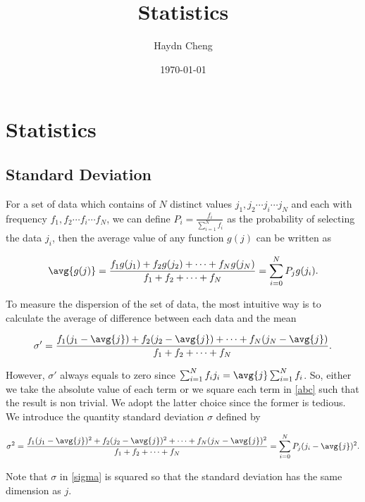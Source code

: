 \documentclass[english,a4paper,12pt]{report}
\title{Statistics}
\author{Haydn Cheng}
\date{\today}
\begin{document}
\maketitle
\tableofcontents
    
\chapter{Statistics}
		
\section{Standard Deviation}

For a set of data which contains of \(N\) distinct values \(j_1, j_2 \cdots j_i \cdots j_N\) and each with frequency \(f_1, f_2 \cdots f_i \cdots f_N\), we can define \(P_i = \frac{f_i}{\sum_{i=1}^{N} f_i}\) as the probability of selecting the data \(j_i\), then the average value of any function \(g(j)\) can be written as 
	
\begin{equation}
	 \avg{g(j)}  = \frac{f_1 g(j_1) + f_2 g(j_2) + \cdots + f_N g(j_N)}{f_1 + f_2 + \cdots + f_N} = \sum_{i=0}^{N} P_j g(j_i). \label{prob} 
\end{equation}
	
To measure the dispersion of the set of data, the most intuitive way is to calculate the average of difference between each data and the mean

\begin{equation} 
	\sigma' = \frac{f_1(j_1 - \avg{ j }) + f_2(j_2 - \avg{ j }) + \cdots + f_N(j_N - \avg{ j })}{f_1 + f_2 + \cdots + f_N}. \label{abc} 
\end{equation}

However, \(\sigma'\) always equals to zero since \(\sum_{i=1}^{N} f_i j_i = \avg{ j } \sum_{i=1}^{N} f_i \). So, either we take the absolute value of each term or we square each term in \cref{abc} such that the result is non trivial. We adopt the latter choice since the former is tedious. We introduce the quantity standard deviation \(\sigma\) defined by

\begin{equation} 
	\sigma^2 = \frac{f_1(j_1 - \avg{ j })^2 + f_2(j_2 - \avg{ j })^2 + \cdots + f_N(j_N - \avg{ j })^2}{f_1 + f_2 + \cdots + f_N} = \sum_{i=0}^{N} P_j (j_i - \avg{ j })^2. \label{sigma} 
\end{equation}

Note that \(\sigma\) in \cref{sigma} is squared so that the standard deviation has the same dimension as \(j\).
\end{document}
